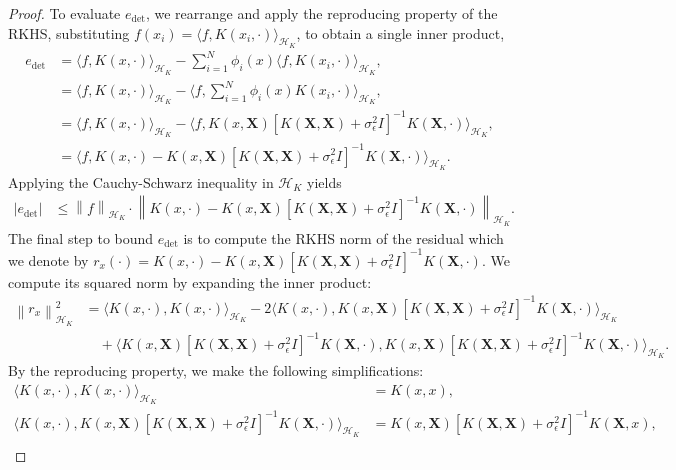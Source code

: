\documentclass{article}
\theoremstyle{definition}
\theoremstyle{remark}
\newcommand{\norm}[1]{\left \lVert #1 \right \rVert}
\begin{document}
\begin{proof}
To evaluate $e_{\text{det}}$, we rearrange and apply the reproducing property of the RKHS, substituting $f(x_i)=\langle f,K(x_i,\cdot)\rangle_{\mathcal{H}_{K}}$, to obtain a single inner product,
\begin{align}
    e_{\text{det}}&=\langle f,K(x,\cdot)\rangle_{\mathcal{H}_{K}}-\sum_{i=1}^N\phi_i(x)\langle f,K(x_i,\cdot)\rangle_{\mathcal{H}_{K}},\\
    &=\langle f,K(x,\cdot)\rangle_{\mathcal{H}_{K}}-\langle f, \sum_{i=1}^N\phi_i(x)K(x_i,\cdot)\rangle_{\mathcal{H}_{K}},\\
    &=\langle f,K(x,\cdot)\rangle_{\mathcal{H}_{K}}-\langle f, K(x,\mathbf{X})[K(\mathbf{X},\mathbf{X})+\sigma_{\epsilon}^2I]^{-1} K(\mathbf{X}, \cdot)\rangle_{\mathcal{H}_{K}},\\
    &=\langle f, K(x,\cdot)- K(x,\mathbf{X})[K(\mathbf{X},\mathbf{X})+\sigma_{\epsilon}^2I]^{-1} K(\mathbf{X}, \cdot)\rangle_{\mathcal{H}_{K}}.
\end{align}
Applying the Cauchy-Schwarz inequality in $\mathcal{H}_{K}$ yields
\begin{align}
     \lvert e_{\text{det}}\rvert &\leq \norm{f}_{\mathcal{H}_{K}}\cdot\norm{K(x,\cdot)- K(x,\mathbf{X})[K(\mathbf{X},\mathbf{X})+\sigma_{\epsilon}^2I]^{-1} K(\mathbf{X}, \cdot)}_{\mathcal{H}_{K}}.
\end{align}
The final step to bound $e_\text{det}$ is to compute the RKHS norm of the residual which we denote by $r_x(\cdot)=K(x,\cdot)- K(x,\mathbf{X})[K(\mathbf{X},\mathbf{X})+\sigma_{\epsilon}^2I]^{-1} K(\mathbf{X}, \cdot)$. We compute its squared norm by expanding the inner product:
\begin{align}
\norm{r_x}^2_{\mathcal{H}_{K}}& =\langle K(x,\cdot),K(x,\cdot)\rangle_{\mathcal{H}_{K}}-2\langle K(x,\cdot), K(x,\mathbf{X})[K(\mathbf{X},\mathbf{X})+\sigma_{\epsilon}^2I]^{-1} K(\mathbf{X}, \cdot)\rangle_{\mathcal{H}_{K}} \\
&\quad + \langle K(x,\mathbf{X})[K(\mathbf{X},\mathbf{X})+\sigma_{\epsilon}^2I]^{-1} K(\mathbf{X}, \cdot),K(x,\mathbf{X})[K(\mathbf{X},\mathbf{X})+\sigma_{\epsilon}^2I]^{-1} K(\mathbf{X}, \cdot)\rangle_{\mathcal{H}_{K}}.
\end{align}
By the reproducing property, we make the following simplifications:
\begin{align}
    \langle K(x,\cdot),K(x,\cdot) \rangle_{\mathcal{H}_{K}} &= K(x,x),\\
    \langle K(x,\cdot), K(x,\mathbf{X})[K(\mathbf{X},\mathbf{X})+\sigma_{\epsilon}^2I]^{-1} K(\mathbf{X}, \cdot)\rangle_{\mathcal{H}_{K}} &= K(x,\mathbf{X})[K(\mathbf{X},\mathbf{X})+\sigma_{\epsilon}^2I]^{-1} K(\mathbf{X}, x),\\

\end{align}
\end{proof}
\end{document}
